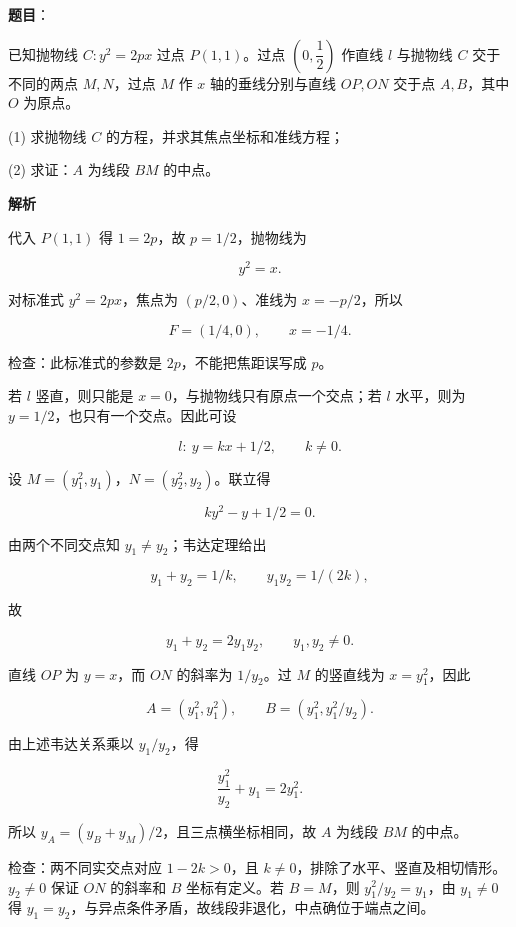 \begin{answer}

\textbf{题目}：

已知抛物线 $C:y^2=2px$ 过点 $P(1,1)$。过点 $\left(0,\dfrac12\right)$ 作直线 $l$ 与抛物线 $C$ 交于不同的两点 $M,N$，过点 $M$ 作 $x$ 轴的垂线分别与直线 $OP,ON$ 交于点 $A,B$，其中 $O$ 为原点。

(1) 求抛物线 $C$ 的方程，并求其焦点坐标和准线方程；

(2) 求证：$A$ 为线段 $BM$ 的中点。

\textbf{解析}


代入 $P(1,1)$ 得 $1=2p$，故 $p=1/2$，抛物线为

\nopagebreak[4]
\[\boxed{y^2=x}.\]

对标准式 $y^2=2px$，焦点为 $(p/2,0)$、准线为 $x=-p/2$，所以

\nopagebreak[4]
\[\boxed{F=(1/4,0),\qquad x=-1/4}.\]

检查：此标准式的参数是 $2p$，不能把焦距误写成 $p$。


若 $l$ 竖直，则只能是 $x=0$，与抛物线只有原点一个交点；若 $l$ 水平，则为 $y=1/2$，也只有一个交点。因此可设

\nopagebreak[4]
\[l:\ y=kx+1/2,\qquad k\ne0.\]

设 $M=(y_1^2,y_1)$，$N=(y_2^2,y_2)$。联立得

\nopagebreak[4]
\[ky^2-y+1/2=0.\]

由两个不同交点知 $y_1\ne y_2$；韦达定理给出

\nopagebreak[4]
\[y_1+y_2=1/k,\qquad y_1y_2=1/(2k),\]

故

\nopagebreak[4]
\[y_1+y_2=2y_1y_2,\qquad y_1,y_2\ne0.\]

直线 $OP$ 为 $y=x$，而 $ON$ 的斜率为 $1/y_2$。过 $M$ 的竖直线为 $x=y_1^2$，因此

\nopagebreak[4]
\[A=(y_1^2,y_1^2),\qquad B=(y_1^2,y_1^2/y_2).\]

由上述韦达关系乘以 $y_1/y_2$，得

\nopagebreak[4]
\[\frac{y_1^2}{y_2}+y_1=2y_1^2.\]

所以 $y_A=(y_B+y_M)/2$，且三点横坐标相同，故 $A$ 为线段 $BM$ 的中点。

检查：两不同实交点对应 $1-2k>0$，且 $k\ne0$，排除了水平、竖直及相切情形。$y_2\ne0$ 保证 $ON$ 的斜率和 $B$ 坐标有定义。若 $B=M$，则 $y_1^2/y_2=y_1$，由 $y_1\ne0$ 得 $y_1=y_2$，与异点条件矛盾，故线段非退化，中点确位于端点之间。



\end{answer}
